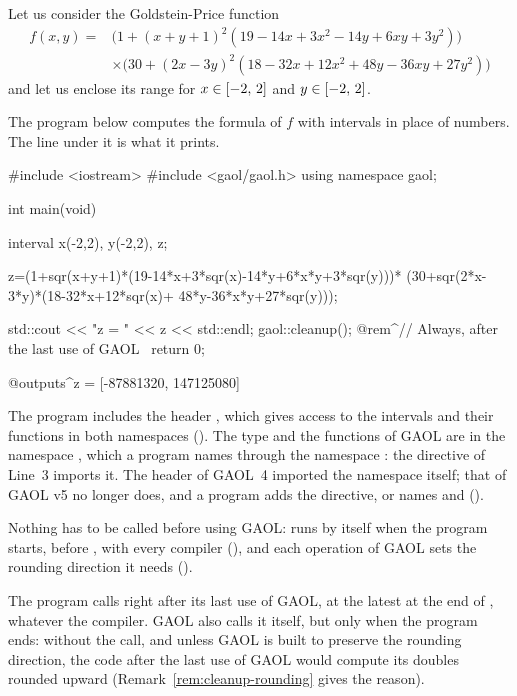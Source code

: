 Let us consider the Goldstein-Price function
\begin{align*}
f(x,y)={}&\bigl(1+(x+y+1)^2(19-14x+3x^2-14y+6xy+3y^2)\bigr)\\
&\times\bigl(30+(2x-3y)^2(18-32x+12x^2+48y-36xy+27y^2)\bigr)
\end{align*}
and let us enclose its range for $x\in[-2,\,2]$ and $y\in[-2,\,2]$.

\begin{Ex}\label{ex:goldstein-price}
The program below computes the formula of $f$ with intervals in place of
numbers. The line under it is what it prints.
 \begin{example}
 #include <iostream>
 #include <gaol/gaol.h>
 using namespace gaol;

 int main(void)
 {
   interval
     x(-2,2),
     y(-2,2), z;

   z=(1+sqr(x+y+1)*(19-14*x+3*sqr(x)-14*y+6*x*y+3*sqr(y)))*
     (30+sqr(2*x-3*y)*(18-32*x+12*sqr(x)+
        48*y-36*x*y+27*sqr(y)));

   std::cout << "z = " << z << std::endl;
   gaol::cleanup(); @rem^// Always, after the last use of GAOL~
   return 0;
 }
 @outputs^z = [-87881320, 147125080]~
 \end{example}
\end{Ex}

The program includes the header , which gives access to
the intervals and their functions in both namespaces (). The type  and the functions of GAOL are
in the namespace , which a program names through the
namespace : the  directive of Line~3 imports it. The
 header of GAOL~4 imported the namespace itself; that of
GAOL v5 no longer does, and a program adds the directive, or names
 and 
().\newinvfive
{}%
%
%

Nothing has to be called before using GAOL:  runs by
itself when the program starts, before , with every compiler
(), and each operation of GAOL sets the rounding direction
it needs ().\newinvfive

\begin{Rem}\label{rem:cleanup}
The program calls  right after its last use of GAOL, at
the latest at the end of , whatever the compiler. GAOL also calls
it itself, but only when the program ends: without the call, and unless GAOL is
built to preserve the rounding direction, the code after the last use of GAOL
would compute its doubles rounded upward (Remark~\ref{rem:cleanup-rounding}
gives the reason).\newinvfive
\end{Rem}

